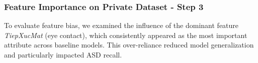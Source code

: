 \documentclass[conference]{IEEEtran}
\begin{document}
\begin{table}[H]
\centering
\caption{5-fold cross-validation performance of enhanced OLA (PCA + OLA with TiepXucMat control) on the private dataset.}
\label{tab:enhanced_ola_cv}
\end{table}
\twocolumn

\subsubsection{Feature Importance on Private Dataset - Step 3}

To evaluate feature bias, we examined the influence of the dominant feature \textit{TiepXucMat} (eye contact), which consistently appeared as the most important attribute across baseline models. This over-reliance reduced model generalization and particularly impacted ASD recall.
\end{document}
